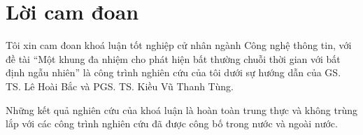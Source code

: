 \chapter*{Lời cam đoan}
\label{thanks}
Tôi xin cam đoan khoá luận tốt nghiệp cử nhân ngành Công nghệ thông tin, với đề tài ``Một khung đa nhiệm cho phát hiện bất thường chuỗi thời gian với bất định ngẫu nhiên'' là công trình nghiên cứu của tôi dưới sự hướng dẫn của GS. TS. Lê Hoài Bắc và PGS. TS. Kiều Vũ Thanh Tùng.

Những kết quả nghiên cứu của khoá luận là hoàn toàn trung thực và không trùng lắp với các công trình nghiên cứu đã được công bố trong nước và ngoài nước.

